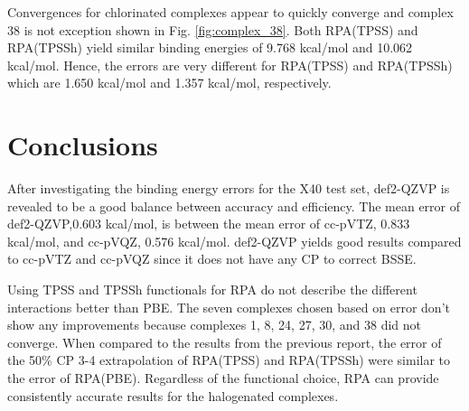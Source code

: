 \documentclass[11pt]{article}
\begin{document}
Convergences for chlorinated complexes appear to quickly converge and
complex 38 is not exception shown in Fig. \ref{fig:complex_38}. Both
RPA(TPSS) and RPA(TPSSh) yield similar binding energies of 9.768 kcal/mol
and 10.062 kcal/mol. Hence, the errors are very different for RPA(TPSS)
and RPA(TPSSh) which are 1.650 kcal/mol and 1.357 kcal/mol, respectively.

\section{Conclusions}

After investigating the binding energy errors for the X40 test set,
def2-QZVP is revealed to be a good balance between accuracy and
efficiency. The mean error of def2-QZVP,0.603 kcal/mol, is between the
mean error of cc-pVTZ, 0.833 kcal/mol, and cc-pVQZ, 0.576 kcal/mol.
def2-QZVP yields good results compared to cc-pVTZ and cc-pVQZ since it
does not have any CP to correct BSSE.

Using TPSS and TPSSh functionals for RPA do not describe the different
interactions better than PBE. The seven complexes chosen based on error
don't show any improvements because complexes 1, 8, 24, 27, 30, and 38
did not converge. When compared to the results from the previous report,
the error of the 50$\%$ CP 3-4 extrapolation of RPA(TPSS) and RPA(TPSSh) were
similar to the error of RPA(PBE). Regardless of the functional choice,
RPA can provide consistently accurate results for the halogenated complexes.


\printbibliography
\end{document}
